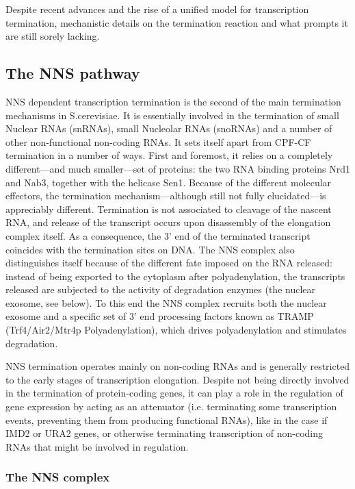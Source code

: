 Despite recent advances and the rise of a unified model for transcription termination, mechanistic details on the termination reaction and what prompts it are still sorely lacking.



\subsection{The NNS pathway}

NNS dependent transcription termination is the second of the main termination mechanisms in S.cerevisiae. 
It is essentially involved in the termination of small Nuclear RNAs (snRNAs), small Nucleolar RNAs (snoRNAs) and a number of other non-functional non-coding RNAs.
It sets itself apart from CPF-CF termination in a number of ways.
First and foremost, it relies on a completely different---and much smaller---set of proteins: the two RNA binding proteins Nrd1 and Nab3, together with the helicase Sen1.
Because of the different molecular effectors, the termination mechanism---although still not fully elucidated---is appreciably different. 
Termination is not associated to cleavage of the nascent RNA, and release of the transcript occurs upon disassembly of the elongation complex itself. 
As a consequence, the 3’ end of the terminated transcript coincides with the termination sites on DNA. 
The NNS complex also distinguishes itself because of the different fate imposed on the RNA released: instead of being exported to the cytoplasm after polyadenylation, the transcripts released are subjected to the activity of degradation enzymes (the nuclear exosome, see below). 
To this end the NNS complex recruits both the nuclear exosome and a specific set of 3' end processing factors known as TRAMP (Trf4/Air2/Mtr4p Polyadenylation), which drives polyadenylation and stimulates degradation.

NNS termination operates mainly on non-coding RNAs and is generally restricted to the early stages of transcription elongation. 
Despite not being directly involved in the termination of protein-coding genes, it can play a role in the regulation of gene expression by acting as an attenuator (i.e. terminating some transcription events, preventing them from producing functional RNAs), like in the case if IMD2 or URA2 genes, or otherwise terminating transcription of non-coding RNAs that might be involved in regulation.



\subsubsection{The NNS complex}

